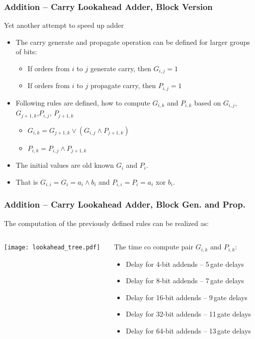 \documentclass{beamer}
\begin{document}
\begin{frame}
\frametitle{Addition -- Carry Lookahead Adder, Block Version}

Yet another attempt to speed up adder
\begin{itemize}
\item The carry generate and propagate operation can be defined for larger groups of bits:
\begin{itemize}
\item If orders from $i$ to $j$ generate carry, then $G_{i,j}=1$
\item If orders from $i$ to $j$ propagate carry, then $P_{i,j}=1$
\end{itemize}
\item Following rules are defined, how to compute $G_{i,k}$ and $P_{i,k}$ based on $G_{i,j}$, $G_{j+1,k}$,$P_{i,j}$, $P_{j+1,k}$
\begin{itemize}
\item $G_{i,k}=G_{j+1,k} \lor (G_{i,j} \land P_{j+1,k})$
\item $P_{i,k}=P_{i,j} \land P_{j+1,k}$
\end{itemize}
\item The initial values are old known $G_i$ and $P_i$. 
\item That is $G_{i,i}=G_i=a_i \land b_i$ and $P_{i,i}=P_i=a_i$ xor $b_i$.
\end{itemize}

\end{frame}

\begin{frame}
\frametitle{Addition -- Carry Lookahead Adder, Block Gen. and Prop.}

The computation of the previously defined rules can be realized as:
\begin{columns}
\begin{column}{0.55\textwidth}
\begin{center}
   \texttt{[image: lookahead\_tree.pdf]}
\end{center}
\end{column}
\begin{column}{0.45\textwidth}

The time co compute pair $G_{i,k}$ and $P_{i,k}$:
\begin{itemize}
\item Delay for 4-bit addends -- 5\,gate delays
\item Delay for 8-bit addends -- 7\,gate delays
\item Delay for 16-bit addends -- 9\,gate delays
\item Delay for 32-bit addends -- 11\,gate delays
\item Delay for 64-bit addends -- 13\,gate delays
\end{itemize}

\end{column}
\end{columns}

\end{frame}
\end{document}
